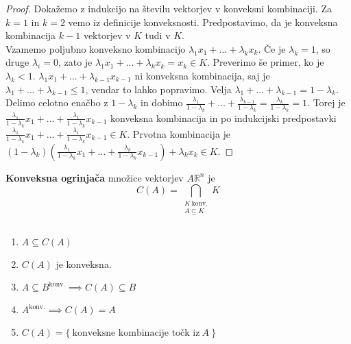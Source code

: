 \documentclass[11pt, a4paper]{article}
\begin{document}
    \begin{proof}
        Dokažemo z indukcijo na številu vektorjev v konveksni kombinaciji. Za \(k=1\) in \(k=2\) vemo iz definicije konveksnosti. Predpostavimo, da je konveksna kombinacija \(k-1\) vektorjev v \(K\) tudi v \(K\). \\
        Vzamemo poljubno konveksno kombinacijo \(\lambda_1 x_1 + ... + \lambda_k x_k\). Če je \(\lambda_k = 1\), so druge \(\lambda_i = 0\), zato je \(\lambda_1 x_1 + ... + \lambda_k x_k = x_k \in K\). Preverimo še primer, ko je \(\lambda_k < 1\). \(\lambda_1 x_1 + ... + \lambda_{k-1} x_{k-1}\) ni konveksna kombinacija, saj je \(\lambda_1 + ... + \lambda_{k-1} \le 1\), vendar to lahko popravimo. Velja \(\lambda_1 + ... + \lambda_{k-1} = 1 - \lambda_k\). Delimo celotno enačbo z \(1-\lambda_k\) in dobimo \(\frac{\lambda_1}{1-\lambda_k} + ... + \frac{\lambda_{k-1}}{1-\lambda_k} = \frac{\lambda_k}{1-\lambda_k}=1\). Torej je \(\frac{\lambda_1}{1-\lambda_k} x_1 + ... + \frac{\lambda_1}{1-\lambda_k} x_{k-1}\) konveksna kombinacija in po indukcijski predpostavki \(\frac{\lambda_1}{1-\lambda_k} x_1 + ... + \frac{\lambda_1}{1-\lambda_k} x_{k-1} \in K\). Prvotna kombinacija je \((1-\lambda_k) (\frac{\lambda_1}{1-\lambda_k} x_1 + ... + \frac{\lambda_k}{1-\lambda_k} x_{k-1}) + \lambda_k x_k \in K\).
    \end{proof}

    \begin{definition}
        \textbf{Konveksna ogrinjača} množice vektorjev \(A \mathbb{R}^n\) je
        \[
            C(A)=\bigcap_{\substack{K\ \text{konv.} \\ A \subseteq K}} K
        \]
    \end{definition}

    \begin{proposition}
        \(\) \\
        \begin{enumerate}[label=(\arabic*)]
            \item \(A \subseteq C(A)\)
            \item \(C(A)\) je konveksna.
            \item \(A \subseteq B^{\text{konv.}} \implies C(A) \subseteq B\)
            \item \(A^{\text{konv.}} \implies C(A)=A\)
            \item \(C(A) = \{\ \text{konveksne kombinacije točk iz}\ A\ \}\) 
        \end{enumerate}
    \end{proposition}
        
\end{document}
